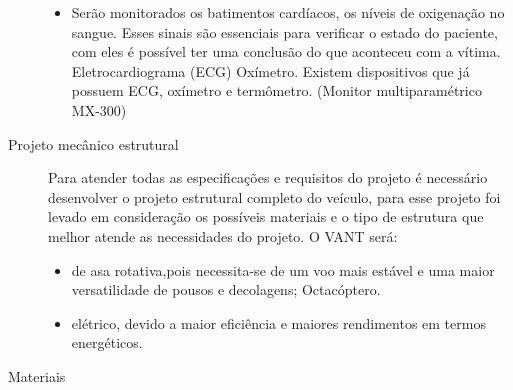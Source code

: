 \begin{description}
\begin{itemize}
	  \item Serão monitorados os batimentos cardíacos, os níveis de oxigenação no sangue. Esses sinais são essenciais para verificar o estado do paciente, com eles é possível ter uma conclusão do que aconteceu com a vítima. 
	    \subitem Eletrocardiograma (ECG)
	    \subitem Oxímetro.
		\subsubitem Existem dispositivos que já possuem ECG, oxímetro e termômetro. (Monitor multiparamétrico MX-300)
  	\end{itemize}
  \item[Projeto mecânico estrutural] \hfill 
  
      Para atender todas as especificações e requisitos do projeto é necessário desenvolver o projeto estrutural completo do veículo, para esse projeto foi levado em consideração os possíveis materiais e o tipo de estrutura que melhor atende as necessidades do projeto.
  	O VANT será:
  	\begin{itemize}
  		\item de asa rotativa,pois necessita-se de um voo mais estável e uma maior versatilidade de pousos e decolagens;
		  \subitem Octacóptero.
		\item elétrico, devido a maior eficiência e maiores rendimentos em termos energéticos.
  	\end{itemize}
  \item[Materiais] \hfill 
  

\end{description}

